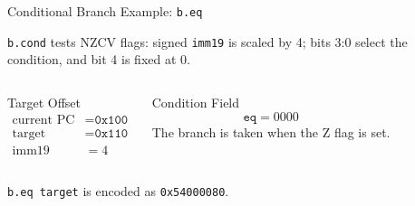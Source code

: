 \documentclass[aspectratio=169,11pt,t]{beamer}
\newcommand{\hex}[1]{\texttt{0x#1}}
\newcommand{\code}[1]{\texttt{#1}}
\newcommand{\bfld}[5]{%
  \pgfmathsetmacro{\cx}{#1 + #3/2}%
  \fill[#5] (#1,#2) rectangle ++(#3,0.72);%
  \draw[navy,line width=0.7pt] (#1,#2) rectangle ++(#3,0.72);%
  \node[font=\scriptsize\ttfamily,text height=1.5ex,text depth=0.35ex,align=center,text=darkgray] at (\cx,#2+0.36) {#4};%
}
\newcommand{\bitnote}[3]{%
  \node[font=\tiny,text height=1.5ex,text depth=0.35ex,align=center,text=darkgray] at (#1,#2) {#3};%
}
\begin{document}

\begin{frame}{Conditional Branch Example: \texttt{b.eq}}

\small
\code{b.cond} tests NZCV flags: signed \code{imm19} is scaled by 4; bits 3:0 select the condition, and bit 4 is fixed at 0.
\vspace{0.12cm}
\begin{columns}[T,onlytextwidth]
\begin{block}{Target Offset}
\[
\begin{aligned}
\text{current PC} &= \hex{100} \\
\text{target} &= \hex{110} \\
\text{imm19} &= 4
\end{aligned}
\]
\end{block}

\begin{block}{Condition Field}
\[
\code{eq} = 0000
\]
The branch is taken when the Z flag is set.
\end{block}
\end{columns}

\vspace{0.2cm}

\begin{center}
\end{center}

\vspace{0.1cm}

\centering
\code{b.eq target} is encoded as \hex{54000080}.

\end{frame}




\end{document}
